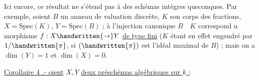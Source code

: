 Ici encore, ce résultat ne s'étend pas à des schémas intègres queconques. Par exemple, soient $B$ un anneau de valuation discrète, $K$ son corps des fractions, $X=\mathrm{Spec}(K)$, $Y=\mathrm{Spec}(B)$ ; à l'injection canonique $B\quad K$ correspond u morphisme $f:X\handwritten{\to}Y$ \uline{de type fini} ($K$ étant en effet engendré par $1/\handwritten{\pi}$, si  $(\handwritten{\pi})$ est l'idéal maximal de $B$) ; mais on a  $\dim(Y)=1$ et $\dim(X)=0$.

\uline{Corollaire 4 .- oient} $X,Y$ \uline{deux préschémas algébriques sur $k$ ; }
